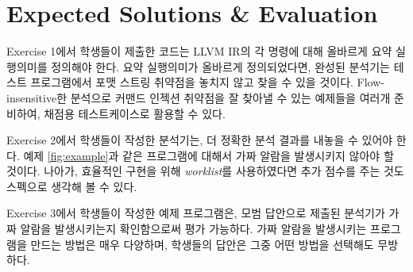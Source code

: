 \documentclass[a4paper, 11pt]{article}
\theoremstyle{definition}
\begin{document}
\section{Expected Solutions \& Evaluation}

Exercise 1에서 학생들이 제출한 코드는 LLVM IR의 각 명령에 대해 올바르게 요약
실행의미를 정의해야 한다. 요약 실행의미가 올바르게 정의되었다면, 완성된
분석기는 테스트 프로그램에서 포맷 스트링 취약점을 놓치지 않고 찾을 수 있을
것이다. Flow-insensitive한 분석으로 커맨드 인젝션 취약점을 잘 찾아낼 수 있는
예제들을 여러개 준비하여, 채점용 테스트케이스로 활용할 수 있다.

Exercise 2에서 학생들이 작성한 분석기는, 더 정확한 분석 결과를 내놓을 수 있어야
한다. 예제 \ref{fig:example}과 같은 프로그램에 대해서 가짜 알람을 발생시키지
않아야 할 것이다. 나아가, 효율적인 구현을 위해 \emph{worklist}\cite{PALecture}를
사용하였다면 추가 점수를 주는 것도 스펙으로 생각해 볼 수 있다.

Exercise 3에서 학생들이 작성한 예제 프로그램은, 모범 답안으로 제출된 분석기가
가짜 알람을 발생시키는지 확인함으로써 평가 가능하다. 가짜 알람을 발생시키는
프로그램을 만드는 방법은 매우 다양하며, 학생들의 답안은 그중 어떤 방법을
선택해도 무방하다.



\end{document}
